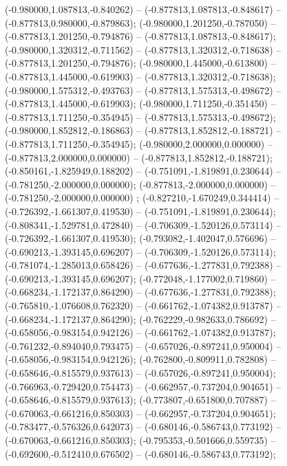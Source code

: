  (-0.980000,1.087813,-0.840262) -- (-0.877813,1.087813,-0.848617) -- (-0.877813,0.980000,-0.879863);
 (-0.980000,1.201250,-0.787050) -- (-0.877813,1.201250,-0.794876) -- (-0.877813,1.087813,-0.848617);
 (-0.980000,1.320312,-0.711562) -- (-0.877813,1.320312,-0.718638) -- (-0.877813,1.201250,-0.794876);
 (-0.980000,1.445000,-0.613800) -- (-0.877813,1.445000,-0.619903) -- (-0.877813,1.320312,-0.718638);
 (-0.980000,1.575312,-0.493763) -- (-0.877813,1.575313,-0.498672) -- (-0.877813,1.445000,-0.619903);
 (-0.980000,1.711250,-0.351450) -- (-0.877813,1.711250,-0.354945) -- (-0.877813,1.575313,-0.498672);
 (-0.980000,1.852812,-0.186863) -- (-0.877813,1.852812,-0.188721) -- (-0.877813,1.711250,-0.354945);
 (-0.980000,2.000000,0.000000) -- (-0.877813,2.000000,0.000000) -- (-0.877813,1.852812,-0.188721);
 (-0.850161,-1.825949,0.188202) -- (-0.751091,-1.819891,0.230644) -- (-0.781250,-2.000000,0.000000);
 (-0.877813,-2.000000,0.000000) -- (-0.781250,-2.000000,0.000000) ;
 (-0.827210,-1.670249,0.344414) -- (-0.726392,-1.661307,0.419530) -- (-0.751091,-1.819891,0.230644);
 (-0.808341,-1.529781,0.472840) -- (-0.706309,-1.520126,0.573114) -- (-0.726392,-1.661307,0.419530);
 (-0.793082,-1.402047,0.576696) -- (-0.690213,-1.393145,0.696207) -- (-0.706309,-1.520126,0.573114);
 (-0.781074,-1.285013,0.658426) -- (-0.677636,-1.277831,0.792388) -- (-0.690213,-1.393145,0.696207);
 (-0.772048,-1.177002,0.719860) -- (-0.668234,-1.172137,0.864290) -- (-0.677636,-1.277831,0.792388);
 (-0.765810,-1.076608,0.762320) -- (-0.661762,-1.074382,0.913787) -- (-0.668234,-1.172137,0.864290);
 (-0.762229,-0.982633,0.786692) -- (-0.658056,-0.983154,0.942126) -- (-0.661762,-1.074382,0.913787);
 (-0.761232,-0.894040,0.793475) -- (-0.657026,-0.897241,0.950004) -- (-0.658056,-0.983154,0.942126);
 (-0.762800,-0.809911,0.782808) -- (-0.658646,-0.815579,0.937613) -- (-0.657026,-0.897241,0.950004);
 (-0.766963,-0.729420,0.754473) -- (-0.662957,-0.737204,0.904651) -- (-0.658646,-0.815579,0.937613);
 (-0.773807,-0.651800,0.707887) -- (-0.670063,-0.661216,0.850303) -- (-0.662957,-0.737204,0.904651);
 (-0.783477,-0.576326,0.642073) -- (-0.680146,-0.586743,0.773192) -- (-0.670063,-0.661216,0.850303);
 (-0.795353,-0.501666,0.559735) -- (-0.692600,-0.512410,0.676502) -- (-0.680146,-0.586743,0.773192);

